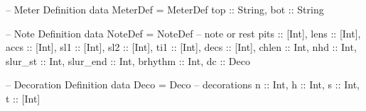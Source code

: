 \documentclass[main.tex]{subfiles}
\begin{document}
\begin{code}
--  Meter Definition
data MeterDef = MeterDef {
                  top :: String, 
                  bot :: String 
                }


--  Note Definition
data NoteDef  = NoteDef {                       -- note or rest
                  pits :: [Int], 
                  lens :: [Int],
                  accs :: [Int],
                  sl1 :: [Int], 
                  sl2 :: [Int],
                  ti1 :: [Int],  
                  decs :: [Int],
                  chlen :: Int,   
                  nhd :: Int,    
                  slur_st :: Int,  
                  slur_end :: Int, 
                  brhythm :: Int, 
                  dc :: Deco     
                }


-- Decoration Definition
data Deco     = Deco {                          -- decorations
                  n :: Int,     
                  h :: Int,    
                  s :: Int,   
                  t :: [Int] 
                }
\end{code}
\end{document}
